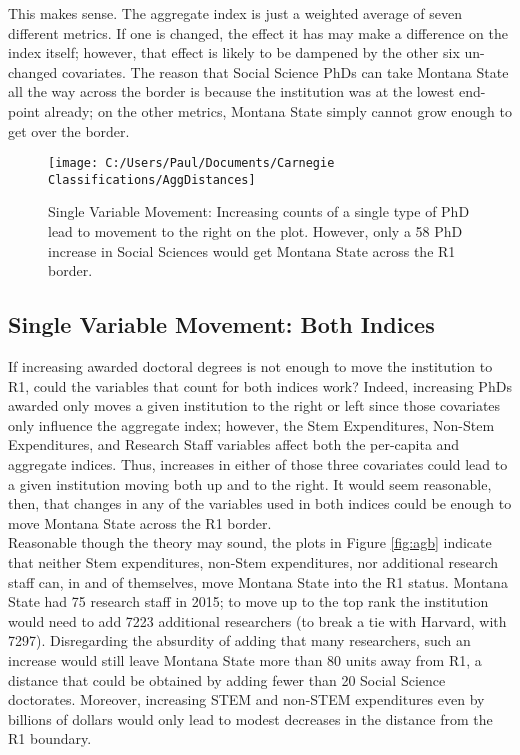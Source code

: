 \documentclass{article}
\begin{document}
  This makes sense. The aggregate index is just a weighted average of seven different metrics. If one is changed, the effect it has may make a difference on the index itself; however, that effect is likely to be dampened by the other six un-changed covariates. The reason that Social Science PhDs can take Montana State all the way across the border is because the institution was at the lowest end-point already; on the other metrics, Montana State simply cannot grow enough to get over the border. 
 
  \begin{figure}
\centering
\texttt{[image: C:/Users/Paul/Documents/Carnegie Classifications/AggDistances]}
\captionsetup{font=footnotesize,labelfont=footnotesize}
\caption{\label{fig:agd} Single Variable Movement: Increasing counts of a single type of PhD lead to movement to the right on the plot. However, only a 58 PhD increase in Social Sciences would get Montana State across the R1 border.}

\end{figure}

\subsection{Single Variable Movement: Both Indices}

If increasing awarded doctoral degrees is not enough to move the institution to R1, could the variables that count for both indices work? Indeed, increasing PhDs awarded only moves a given institution to the right or left since those covariates only influence the aggregate index; however, the Stem Expenditures, Non-Stem Expenditures, and Research Staff variables affect both the per-capita and aggregate indices. Thus, increases in either of those three covariates could lead to a given institution moving both up and to the right.  It would seem reasonable, then, that changes in any of the variables used in both indices could be enough to move Montana State across the R1 border. \\
  Reasonable though the theory may sound, the plots in Figure \ref{fig:agb} indicate that neither Stem expenditures, non-Stem expenditures, nor additional research staff can, in and of themselves, move Montana State into the R1 status. Montana State had 75 research staff in 2015; to move up to the top rank the institution would need to add 7223 additional researchers (to break a tie with Harvard, with 7297). Disregarding the absurdity of adding that many researchers, such an increase would still leave Montana State more than 80 units away from R1, a distance that could be obtained by adding fewer than 20 Social Science doctorates.  Moreover, increasing STEM and non-STEM expenditures even by billions of dollars would only lead to modest decreases in the distance from the R1 boundary. \\
\end{document}
